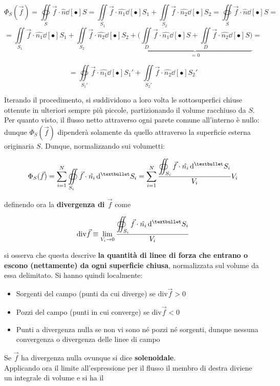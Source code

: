 \[\Phi_S(\vec{f}) = \oiint\limits_{S} \vec{f} \cdot \hat{n}\dd[•]{S} = \iint\limits_{S_1} \vec{f} \cdot \hat{n_1}\dd[•]{S_1} + \iint\limits_{S_2} \vec{f} \cdot \hat{n_2}\dd[•]{S_2} = \oiint\limits_{S} \vec{f} \cdot \hat{n}\dd[•]{S} = \]
\[=\iint\limits_{S_1} \vec{f} \cdot \hat{n_1}\dd[•]{S_1} + \iint\limits_{S_2} \vec{f} \cdot \hat{n_2}\dd[•]{S_2} + \underbrace{\big(\iint\limits_{D} \vec{f} \cdot \hat{n_1}\dd[•]{S} + \iint\limits_{D} \vec{f} \cdot \hat{n_2}\dd[•]{S}\big)}_{= 0} = \]

\[ = \oiint\limits_{S_1'} \vec{f} \cdot \hat{n_1}\dd[•]{S_1'} + \iint\limits_{S_2'} \vec{f} \cdot \hat{n_2}\dd[•]{S_2'}\]

Iterando il procedimento, si suddividono a loro volta le sottosuperfici chiuse ottenute in ulteriori sempre più piccole, partizionando il volume racchiuso da $S$. Per quanto visto, il flusso netto attraverso ogni parete comune all'interno è nullo: dunque $\Phi_S(\vec{f})$ dipenderà solamente da quello attraverso la superficie esterna originaria $S$. Dunque, normalizzando sui volumetti:

\[\Phi_S(\vec{f}) = \sum\limits_{i=1}^{N} \oiint\limits_{S_i} \vec{f} \cdot \hat{n_i}\dd[•]{S_i} = \sum\limits_{i=1}^{N} \frac{ \ds\oiint_{S_i} \vec{f} \cdot \hat{n_i}\dd[•]{S_i}}{V_i} V_i\]

definendo ora la \textbf{divergenza di $\vec{f}$} come

\[\mathrm{div} \vec{f} \equiv \lim\limits_{V_i \rightarrow 0} \frac{\ds \oiint_{S_i} \vec{f} \cdot \hat{n_i}\dd[•]{S_i}}{V_i}\]

si osserva che questa descrive \textbf{la quantità di linee di forza che entrano o escono (nettamente) da ogni superficie chiusa}, normalizzata sul volume da essa delimitato. Si hanno quindi localmente:

\begin{itemize}

\item Sorgenti del campo (punti da cui diverge) se $\mathrm{div} \vec{f} > 0$

\item Pozzi del campo (punti in cui converge) se $\mathrm{div} \vec{f} < 0$

\item Punti a divergenza nulla se non vi sono né pozzi né sorgenti, dunque nessuna convergenza o divergenza delle linee di campo

\end{itemize}

Se $\vec{f}$ ha divergenza nulla ovunque si dice \textbf{solenoidale}.
\\Applicando ora il limite all'espressione per il flusso il membro di destra diviene un integrale di volume e si ha il

